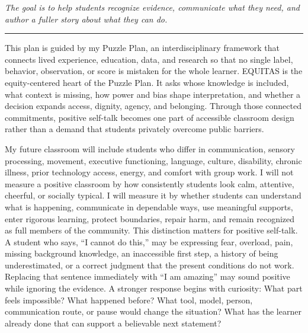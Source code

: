 \documentclass[11pt]{article}
\newcommand{\reviewsection}[1]{%
  \Needspace{4\baselineskip}
  \vspace{0.08in}\noindent{\normalsize\bfseries\color{PrimaryRed}#1}
  \par\vspace{0.025in}
}
\begin{document}
\begin{titlepage}
\vfill

\begin{center}
\begin{minipage}{0.92\textwidth}
\centering\itshape
The goal is to help students recognize evidence, communicate what they need, and author a fuller story about what they can do.\\
{\color{PrimaryRed}\rule{4.2in}{0.8pt}}
\end{minipage}
\end{center}

\vfill

\begin{center}
\begin{minipage}{0.95\textwidth}
\small
This plan is guided by my Puzzle Plan, an interdisciplinary framework that connects lived experience, education, data, and research so that no single label, behavior, observation, or score is mistaken for the whole learner. EQUITAS is the equity-centered heart of the Puzzle Plan. It asks whose knowledge is included, what context is missing, how power and bias shape interpretation, and whether a decision expands access, dignity, agency, and belonging. Through those connected commitments, positive self-talk becomes one part of accessible classroom design rather than a demand that students privately overcome public barriers.
\end{minipage}
\end{center}

\restoregeometry
\end{titlepage}
\hypersetup{pageanchor=true}

\reviewsection{What Makes a Classroom Support Truly Positive}

My future classroom will include students who differ in communication, sensory processing, movement, executive functioning, language, culture, disability, chronic illness, prior technology access, energy, and comfort with group work. I will not measure a positive classroom by how consistently students look calm, attentive, cheerful, or socially typical. I will measure it by whether students can understand what is happening, communicate in dependable ways, use meaningful supports, enter rigorous learning, protect boundaries, repair harm, and remain recognized as full members of the community. This distinction matters for positive self-talk. A student who says, ``I cannot do this,'' may be expressing fear, overload, pain, missing background knowledge, an inaccessible first step, a history of being underestimated, or a correct judgment that the present conditions do not work. Replacing that sentence immediately with ``I am amazing'' may sound positive while ignoring the evidence. A stronger response begins with curiosity: What part feels impossible? What happened before? What tool, model, person, communication route, or pause would change the situation? What has the learner already done that can support a believable next statement?
\end{document}
